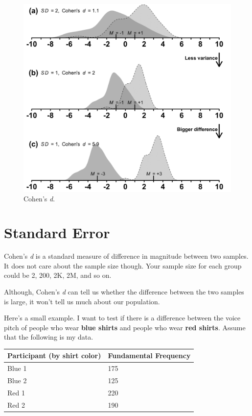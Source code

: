 \documentclass[
]{book}
\begin{document}
\begin{figure}
\centering
\includegraphics{./img/cohens.png}
\caption{\label{fig:cohens}Cohen's \emph{d}.}
\end{figure}

\section{Standard Error}\label{standard-error}

Cohen's \emph{d} is a standard measure of difference in magnitude between two samples. It does not care about the sample size though. Your sample size for each group could be 2, 200, 2K, 2M, and so on.

Although, Cohen's \emph{d} can tell us whether the difference between the two samples is large, it won't tell us much about our population.

Here's a small example. I want to test if there is a difference between the voice pitch of people who wear \textbf{blue shirts} and people who wear \textbf{red shirts}. Assume that the following is my data.

\begin{longtable}[]{@{}ll@{}}
\toprule\noalign{}
\textbf{Participant (by shirt color) } & \textbf{Fundamental Frequency} \\
\midrule\noalign{}
\endhead
\bottomrule\noalign{}
\endlastfoot
Blue 1 & 175 \\
Blue 2 & 125 \\
Red 1 & 220 \\
Red 2 & 190 \\
\end{longtable}
\end{document}
